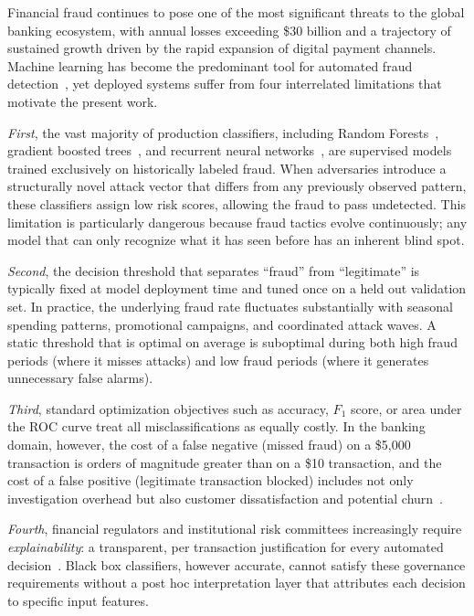 \documentclass[conference]{IEEEtran}
\begin{document}
Financial fraud continues to pose one of the most significant threats to the global banking ecosystem, with annual losses exceeding \$30 billion and a trajectory of sustained growth driven by the rapid expansion of digital payment channels. Machine learning has become the predominant tool for automated fraud detection~\cite{dal_pozzolo2017credit}, yet deployed systems suffer from four interrelated limitations that motivate the present work.

\textit{First}, the vast majority of production classifiers, including Random Forests~\cite{breiman2001random}, gradient boosted trees~\cite{chen2016xgboost}, and recurrent neural networks~\cite{hochreiter1997long}, are supervised models trained exclusively on historically labeled fraud. When adversaries introduce a structurally novel attack vector that differs from any previously observed pattern, these classifiers assign low risk scores, allowing the fraud to pass undetected. This limitation is particularly dangerous because fraud tactics evolve continuously; any model that can only recognize what it has seen before has an inherent blind spot.

\textit{Second}, the decision threshold that separates ``fraud'' from ``legitimate'' is typically fixed at model deployment time and tuned once on a held out validation set. In practice, the underlying fraud rate fluctuates substantially with seasonal spending patterns, promotional campaigns, and coordinated attack waves. A static threshold that is optimal on average is suboptimal during both high fraud periods (where it misses attacks) and low fraud periods (where it generates unnecessary false alarms).

\textit{Third}, standard optimization objectives such as accuracy, $F_1$ score, or area under the ROC curve treat all misclassifications as equally costly. In the banking domain, however, the cost of a false negative (missed fraud) on a \$5{,}000 transaction is orders of magnitude greater than on a \$10 transaction, and the cost of a false positive (legitimate transaction blocked) includes not only investigation overhead but also customer dissatisfaction and potential churn~\cite{elkan2001foundations}.

\textit{Fourth}, financial regulators and institutional risk committees increasingly require \textit{explainability}: a transparent, per transaction justification for every automated decision~\cite{arrieta2020explainable}. Black box classifiers, however accurate, cannot satisfy these governance requirements without a post hoc interpretation layer that attributes each decision to specific input features.
\end{document}
